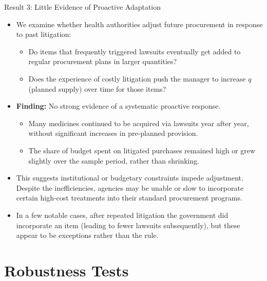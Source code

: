 \documentclass{beamer}
\begin{document}
\begin{frame}{Result 3: Little Evidence of Proactive Adaptation}
\begin{itemize}
  \item We examine whether health authorities adjust future procurement in response to past litigation:
    \begin{itemize}
      \item Do items that frequently triggered lawsuits eventually get added to regular procurement plans in larger quantities?
      \item Does the experience of costly litigation push the manager to increase $q$ (planned supply) over time for those items?
    \end{itemize}
  \item \textbf{Finding:} No strong evidence of a systematic proactive response.
    \begin{itemize}
      \item Many medicines continued to be acquired via lawsuits year after year, without significant increases in pre-planned provision.
      \item The share of budget spent on litigated purchases remained high or grew slightly over the sample period, rather than shrinking.
    \end{itemize}
  \item This suggests institutional or budgetary constraints impede adjustment. Despite the inefficiencies, agencies may be unable or slow to incorporate certain high-cost treatments into their standard procurement programs.
  \item In a few notable cases, after repeated litigation the government did incorporate an item (leading to fewer lawsuits subsequently), but these appear to be exceptions rather than the rule.
\end{itemize}
\end{frame}

\section{Robustness Tests}
\end{document}
